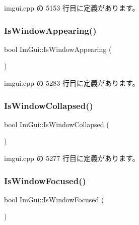  imgui.\+cpp の 5153 行目に定義があります。

\mbox{\label{namespace_im_gui_a99fd14154aae264087d471132e56a42e}} 
\subsubsection{\texorpdfstring{Is\+Window\+Appearing()}{IsWindowAppearing()}}
{\footnotesize\ttfamily bool Im\+Gui\+::\+Is\+Window\+Appearing (\begin{DoxyParamCaption}{ }\end{DoxyParamCaption})}



 imgui.\+cpp の 5283 行目に定義があります。

\mbox{\label{namespace_im_gui_a2a6492aea9013c0078fc530a66e11768}} 
\subsubsection{\texorpdfstring{Is\+Window\+Collapsed()}{IsWindowCollapsed()}}
{\footnotesize\ttfamily bool Im\+Gui\+::\+Is\+Window\+Collapsed (\begin{DoxyParamCaption}{ }\end{DoxyParamCaption})}



 imgui.\+cpp の 5277 行目に定義があります。

\mbox{\label{namespace_im_gui_a1bc0d66039324e071c7d1ae20f9b1211}} 
\subsubsection{\texorpdfstring{Is\+Window\+Focused()}{IsWindowFocused()}}
{\footnotesize\ttfamily bool Im\+Gui\+::\+Is\+Window\+Focused (\begin{DoxyParamCaption}{ }\end{DoxyParamCaption})}



